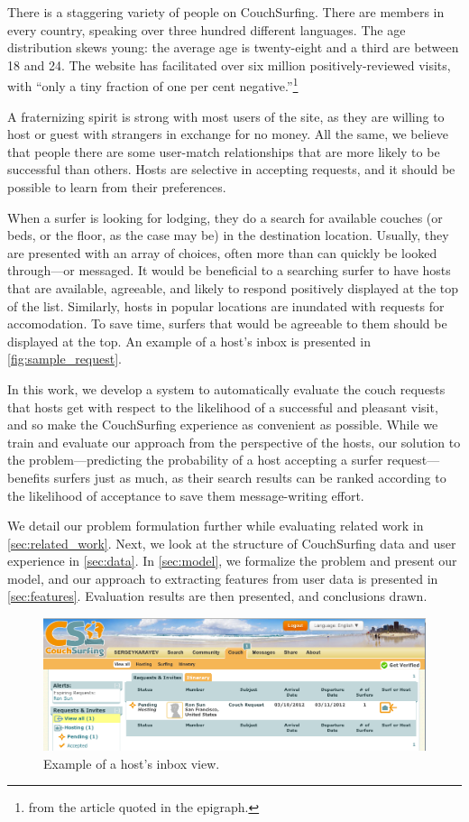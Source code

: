 There is a staggering variety of people on CouchSurfing.
There are members in every country, speaking over three hundred different languages.
The age distribution skews young: the average age is twenty-eight and a third are between 18 and 24.
The website has facilitated over six million positively-reviewed visits, with ``only a tiny fraction of one per cent negative.''\footnote{from the article quoted in the epigraph.}

A fraternizing spirit is strong with most users of the site, as they are willing to host or guest with strangers in exchange for no money.
All the same, we believe that people there are some user-match relationships that are more likely to be successful than others.
Hosts are selective in accepting requests, and it should be possible to learn from their preferences.

When a surfer is looking for lodging, they do a search for available couches (or beds, or the floor, as the case may be) in the destination location.
Usually, they are presented with an array of choices, often more than can quickly be looked through---or messaged.
It would be beneficial to a searching surfer to have hosts that are available, agreeable, and likely to respond positively displayed at the top of the list.
Similarly, hosts in popular locations are inundated with requests for accomodation.
To save time, surfers that would be agreeable to them should be displayed at the top.
An example of a host's inbox is presented in \autoref{fig:sample_request}.

In this work, we develop a system to automatically evaluate the couch requests that hosts get with respect to the likelihood of a successful and pleasant visit, and so make the CouchSurfing experience as convenient as possible.
While we train and evaluate our approach from the perspective of the hosts, our solution to the problem---predicting the probability of a host accepting a surfer request---benefits surfers just as much, as their search results can be ranked according to the likelihood of acceptance to save them message-writing effort.

We detail our problem formulation further while evaluating related work in \autoref{sec:related_work}.
Next, we look at the structure of CouchSurfing data and user experience in \autoref{sec:data}.
In \autoref{sec:model}, we formalize the problem and present our model, and our approach to extracting features from user data is presented in \autoref{sec:features}.
Evaluation results are then presented, and conclusions drawn.

\begin{figure}[ht]
\centering
\includegraphics[width=0.8\linewidth]{figures/screenshots/requests.png}
\caption{Example of a host's inbox view.}
\label{fig:sample_request}
\end{figure}

